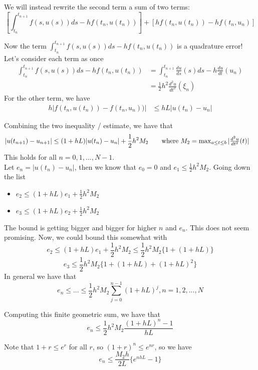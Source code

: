 \documentclass{article}
\begin{document}
We will instead rewrite the second term a sum of two terms:
\[[\int_{t_n}^{t_{n+1}} f(s, u(s)) ds - h f(t_n, u(t_n))] + [h f(t_n, u(t_n)) - h f(t_n, u_n)] \]

Now the term $\int_{t_n}^{t_{n+1}} f(s, u(s)) ds - h f(t_n, u(t_n))$ is a quadrature error! Let's consider each term as once\allowdisplaybreaks
\begin{align*}
    \int_{t_n}^{t_{n+1}} f(s, u(s)) ds - h f(t_n, u(t_n)) &= \int_{t_n}^{t_{n+1}} \frac{du}{ds}(s) ds - h \frac{du}{dt}(u_n) \tag*{Since $du/dt = f(t, u(t))$}\\
    &= \frac{1}{2} h^2 \frac{d^2 u}{d t^2}(\xi_n) \tag*{Using the Remainder rule for LHR, for some $\xi_n \in (a, b)$}
\end{align*}
For the other term, we have
\begin{align*}
    h |f(t_n, u(t_n)) - f(t_n, u_n))| &\leq h L |u(t_n) - u_n| \tag*{Lipschitz Condition}
\end{align*}

Combining the two inequality / estimate, we have that
\begin{align*}
    |u(t_{n+1}) - u_{n+1}| &\leq (1 + hL) |u(t_n) - u_n| + \frac{1}{2} h^2 M_2 \tag*{where $M_2 = \max_{a \leq t \leq b} |\frac{d^2 u}{d t^2}(t)|$}
\end{align*}
This holds for all $n = 0, 1, ..., N-1$.\\

Let $e_n = |u(t_n) - u_n|$, then we know that $e_0 = 0$ and $e_1 \leq \frac{1}{2} h^2 M_2$. Going down the list
\begin{itemize}
    \item $e_2 \leq (1 + hL) e_1 + \frac{1}{2} h^2 M_2$
    \item $e_3 \leq (1 + hL) e_2 + \frac{1}{2} h^2 M_2$
\end{itemize}
The bound is getting bigger and bigger for higher $n$ and $e_n$. This does not seem promising. Now, we could bound this somewhat with
\[e_2 \leq (1 + hL) e_1 + \frac{1}{2} h^2 M_2 \leq \frac{1}{2} h^2 M_2 \{1 + (1 + hL)\}\]
\[e_3 \leq \frac{1}{2} h^2 M_2 \{1 + (1 + hL) + (1 + hL)^2\}\]
In general we have that
\[e_n \leq ... \leq \frac{1}{2} h^2 M_2 \sum_{j = 0}^{n-1} (1 + h L)^j, n = 1, 2, ..., N \]

Computing this finite geometric sum, we have that
\[e_n \leq \frac{1}{2} h^2 M_2 \frac{(1 + hL)^n - 1}{hL} \]

Note that $1 + r \leq e^r$ for all $r$, so $(1 + r)^n \leq e^{nr}$, so we have
\[e_n \leq \frac{M_2 h}{2L} \{e^{n hL} - 1\}\]
\end{document}
